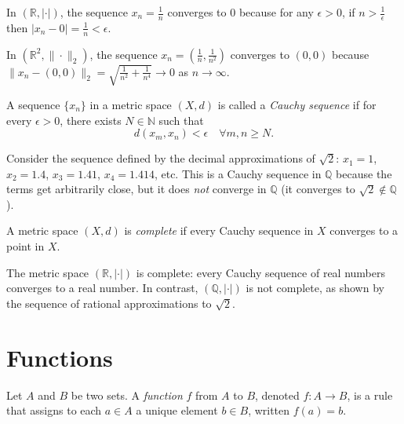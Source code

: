 \begin{example}
In $(\mathbb{R}, |\cdot|)$, the sequence $x_n = \frac{1}{n}$ converges to $0$ because for any $\epsilon > 0$, if $n > \frac{1}{\epsilon}$ then $|x_n - 0| = \frac{1}{n} < \epsilon$.
\end{example}

\begin{example}
In $(\mathbb{R}^2, \|\cdot\|_2)$, the sequence $x_n = \left(\frac{1}{n}, \frac{1}{n^2}\right)$ converges to $(0,0)$ because $\|x_n - (0,0)\|_2 = \sqrt{\frac{1}{n^2} + \frac{1}{n^4}} \to 0$ as $n \to \infty$.
\end{example}

\begin{definition}
A sequence $\{x_n\}$ in a metric space $(X,d)$ is called a \emph{Cauchy sequence} if for every $\epsilon > 0$, there exists $N \in \mathbb{N}$ such that
\[
d(x_m, x_n) < \epsilon \quad \forall m,n \geq N.
\]
\end{definition}

\begin{example}
Consider the sequence defined by the decimal approximations of $\sqrt{2}$: $x_1 = 1$, $x_2 = 1.4$, $x_3 = 1.41$, $x_4 = 1.414$, etc.  
This is a Cauchy sequence in $\mathbb{Q}$ because the terms get arbitrarily close, but it does \emph{not} converge in $\mathbb{Q}$ (it converges to $\sqrt{2} \notin \mathbb{Q}$).
\end{example}

\begin{definition}
A metric space $(X,d)$ is \emph{complete} if every Cauchy sequence in $X$ converges to a point in $X$.
\end{definition}

\begin{example}
The metric space $(\mathbb{R}, |\cdot|)$ is complete: every Cauchy sequence of real numbers converges to a real number.  
In contrast, $(\mathbb{Q}, |\cdot|)$ is not complete, as shown by the sequence of rational approximations to $\sqrt{2}$.
\end{example}

\section{Functions}

\begin{definition}[Function]
Let $A$ and $B$ be two sets.  
A \emph{function} $f$ from $A$ to $B$, denoted $f:A \to B$, is a rule that assigns to each $a \in A$ a unique element $b \in B$, written $f(a) = b$.  
\end{definition}

